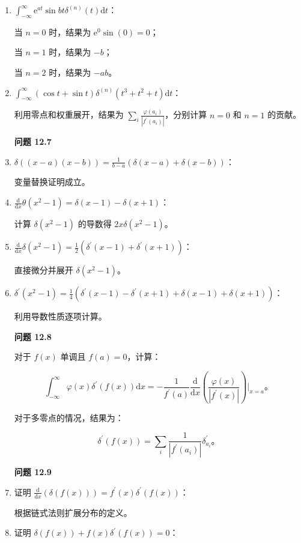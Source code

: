 \begin{enumerate}

\item
  $\int_{-\infty}^\infty \mathrm{e}^{a t} \sin b t \delta^{(n)}(t) \mathrm{d}t$：


当 $n=0$ 时，结果为 $\mathrm{e}^{0} \sin(0) = 0$；

当 $n=1$ 时，结果为 $-b$；

当 $n=2$ 时，结果为 $-a b$。


\item
  $\int_{-\infty}^\infty (\cos t + \sin t) \delta^{(n)}(t^3 + t^2 + t) \mathrm{d}t$：


利用零点和权重展开，结果为
$\sum_i \frac{\varphi(a_i)}{|f^{\prime}(a_i)|}$，分别计算 $n=0$ 和
$n=1$ 的贡献。


\textbf{问题 12.7}


\item
  $\delta((x-a)(x-b)) = \frac{1}{b-a}(\delta(x-a) + \delta(x-b))$：


变量替换证明成立。

\item
  $\frac{\mathrm{d}}{\mathrm{d}x} \theta(x^2-1) = \delta(x-1) - \delta(x+1)$：

计算 $\delta(x^2-1)$ 的导数得 $2x \delta(x^2-1)$。


\item
  $\frac{\mathrm{d}}{\mathrm{d}x} \delta(x^2-1) = \frac{1}{2}\left(\delta^{\prime}(x-1) + \delta^{\prime}(x+1)\right)$：


直接微分并展开 $\delta(x^2-1)$。


\item
  $\delta^{\prime}(x^2-1) = \frac{1}{4}\left(\delta^{\prime}(x-1) - \delta^{\prime}(x+1) + \delta(x-1) + \delta(x+1)\right)$：


利用导数性质逐项计算。



\textbf{问题 12.8}

对于 $f(x)$ 单调且 $f(a) = 0$，计算：

$$
\int_{-\infty}^\infty \varphi(x) \delta^{\prime}(f(x)) \mathrm{d}x = -\frac{1}{f^{\prime}(a)} \frac{\mathrm{d}}{\mathrm{d}x}\left(\frac{\varphi(x)}{|f^{\prime}(x)|}\right)\Big|_{x=a}。
$$

对于多零点的情况，结果为：

$$
\delta^{\prime}(f(x)) = \sum_i \frac{1}{|f^{\prime}(a_i)|} \delta_{a_i}^{\prime}。
$$


\textbf{问题 12.9}


\item
  证明
  $\frac{\mathrm{d}}{\mathrm{d}x} (\delta(f(x))) = f^{\prime}(x) \delta^{\prime}(f(x))$：


根据链式法则扩展分布的定义。


\item
  证明 $\delta(f(x)) + f(x) \delta^{\prime}(f(x)) = 0$：
\end{enumerate}


